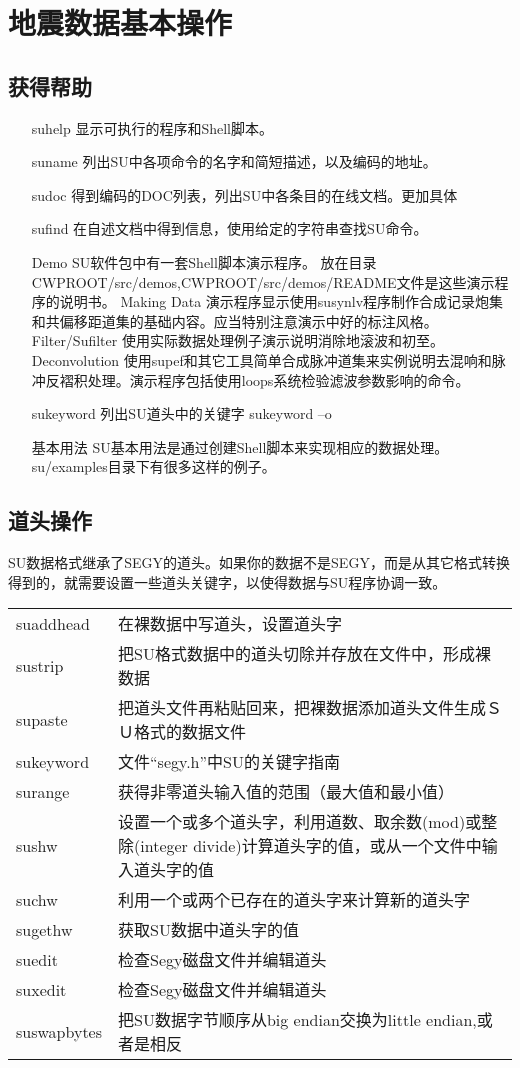 \chapter{地震数据基本操作}
\section{获得帮助}


\begin{enumerate}
	\item[suhelp] 显示可执行的程序和Shell脚本。
	\item[suname] 列出SU中各项命令的名字和简短描述，以及编码的地址。
	\item[sudoc] 得到编码的DOC列表，列出SU中各条目的在线文档。更加具体
	\item[sufind] 在自述文档中得到信息，使用给定的字符串查找SU命令。
	\item[Demo] SU软件包中有一套Shell脚本演示程序。
	放在目录CWPROOT/src/demos,CWPROOT/src/demos/README文件是这些演示程序的说明书。
	Making Data 演示程序显示使用susynlv程序制作合成记录炮集和共偏移距道集的基础内容。应当特别注意演示中好的标注风格。
	Filter/Sufilter 使用实际数据处理例子演示说明消除地滚波和初至。
	Deconvolution 使用supef和其它工具简单合成脉冲道集来实例说明去混响和脉冲反褶积处理。演示程序包括使用loops系统检验滤波参数影响的命令。
	\item[sukeyword] 列出SU道头中的关键字  sukeyword –o
	\item[基本用法] SU基本用法是通过创建Shell脚本来实现相应的数据处理。su/examples目录下有很多这样的例子。   
\end{enumerate}   


\section{道头操作}
SU数据格式继承了SEGY的道头。如果你的数据不是SEGY，而是从其它格式转换得到的，就需要设置一些道头关键字，以使得数据与SU程序协调一致。\\
\begin{tabular}{lp{}}
	\toprule
	suaddhead & 在裸数据中写道头，设置道头字\\
	sustrip & 把SU格式数据中的道头切除并存放在文件中，形成裸数据\\
	supaste & 把道头文件再粘贴回来，把裸数据添加道头文件生成ＳＵ格式的数据文件\\
	sukeyword & 文件“segy.h”中SU的关键字指南\\
	surange & 获得非零道头输入值的范围（最大值和最小值）\\
	sushw & 设置一个或多个道头字，利用道数、取余数(mod)或整除(integer divide)计算道头字的值，或从一个文件中输入道头字的值\\
	suchw & 利用一个或两个已存在的道头字来计算新的道头字	\\
	sugethw & 获取SU数据中道头字的值\\
	suedit & 检查Segy磁盘文件并编辑道头\\
	suxedit & 检查Segy磁盘文件并编辑道头\\	
	suswapbytes & 把SU数据字节顺序从big endian交换为little endian,或者是相反\\
	\bottomrule
\end{tabular}


